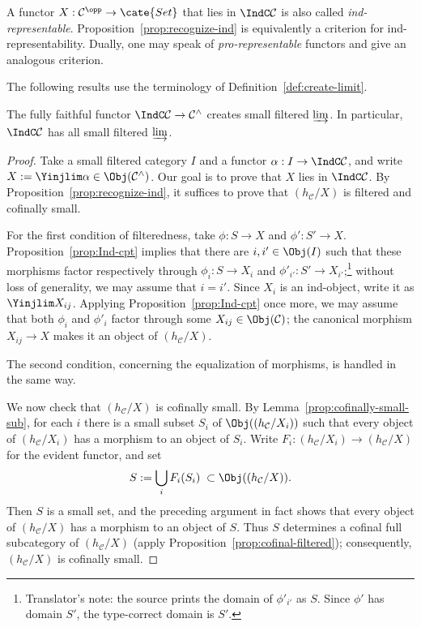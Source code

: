 A functor $X:\mathcal{C}^{\opp}\to\cate{Set}$ that lies in $\IndC\mathcal{C}$ is also called \emph{ind-representable}. Proposition~\ref{prop:recognize-ind} is equivalently a criterion for ind-representability. Dually, one may speak of \emph{pro-representable} functors and give an analogous criterion.

The following results use the terminology of Definition~\ref{def:create-limit}.

\begin{proposition}\label{prop:Ind-filtered-colim}
	The fully faithful functor $\IndC\mathcal{C}\to\mathcal{C}^\wedge$ creates small filtered $\varinjlim$. In particular, $\IndC\mathcal{C}$ has all small filtered $\varinjlim$.
\end{proposition}
\begin{proof}
	Take a small filtered category $I$ and a functor $\alpha:I\to\IndC\mathcal{C}$, and write $X:=\Yinjlim\alpha\in\Obj(\mathcal{C}^\wedge)$. Our goal is to prove that $X$ lies in $\IndC\mathcal{C}$. By Proposition~\ref{prop:recognize-ind}, it suffices to prove that $(h_{\mathcal{C}}/X)$ is filtered and cofinally small.

	For the first condition of filteredness, take $\phi:S\to X$ and $\phi':S'\to X$. Proposition~\ref{prop:Ind-cpt} implies that there are $i,i'\in\Obj(I)$ such that these morphisms factor respectively through $\phi_i:S\to X_i$ and $\phi'_{i'}:S'\to X_{i'}$;\footnote{Translator's note: the source prints the domain of $\phi'_{i'}$ as $S$. Since $\phi'$ has domain $S'$, the type-correct domain is $S'$.} without loss of generality, we may assume that $i=i'$. Since $X_i$ is an ind-object, write it as $\Yinjlim X_{ij}$. Applying Proposition~\ref{prop:Ind-cpt} once more, we may assume that both $\phi_i$ and $\phi'_i$ factor through some $X_{ij}\in\Obj(\mathcal{C})$; the canonical morphism $X_{ij}\to X$ makes it an object of $(h_{\mathcal{C}}/X)$.

	The second condition, concerning the equalization of morphisms, is handled in the same way.

	We now check that $(h_{\mathcal{C}}/X)$ is cofinally small. By Lemma~\ref{prop:cofinally-small-sub}, for each $i$ there is a small subset $S_i$ of $\Obj((h_{\mathcal{C}}/X_i))$ such that every object of $(h_{\mathcal{C}}/X_i)$ has a morphism to an object of $S_i$. Write $F_i:(h_{\mathcal{C}}/X_i)\to(h_{\mathcal{C}}/X)$ for the evident functor, and set
	\[ S:=\bigcup_i F_i(S_i)\;\subset\Obj((h_{\mathcal{C}}/X)). \]
	Then $S$ is a small set, and the preceding argument in fact shows that every object of $(h_{\mathcal{C}}/X)$ has a morphism to an object of $S$. Thus $S$ determines a cofinal full subcategory of $(h_{\mathcal{C}}/X)$ (apply Proposition~\ref{prop:cofinal-filtered}); consequently, $(h_{\mathcal{C}}/X)$ is cofinally small.
\end{proof}

